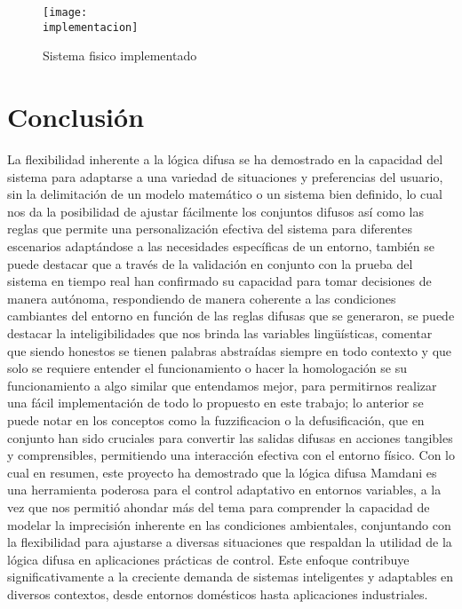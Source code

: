\documentclass[a4paper, 12pt]{article}
\newcommand{\implementacion}{img/sistemaFisico.jpg}
\begin{document}
	\begin{figure}[!h]
		\centering
		\texttt{[image: \\implementacion]}
		\caption{Sistema fisico implementado}
        \label{fig:fisico}
	\end{figure}

    \section{Conclusión}
    La flexibilidad inherente a la lógica difusa se ha demostrado en la capacidad del sistema para adaptarse a una variedad de situaciones y preferencias del usuario, sin la delimitación de un modelo matemático o un sistema bien definido, lo cual nos da  la posibilidad de ajustar fácilmente los conjuntos difusos así como las reglas que permite una personalización efectiva del sistema para diferentes escenarios adaptándose a las necesidades específicas de un entorno, también se puede destacar que a través de la validación en conjunto con la prueba del sistema en tiempo real han confirmado su capacidad para tomar decisiones de manera autónoma, respondiendo de manera coherente a las condiciones cambiantes del entorno en función de las reglas difusas que se generaron, se puede destacar la inteligibilidades que nos brinda las variables lingüísticas, comentar que siendo honestos se tienen palabras abstraídas siempre en todo contexto y que solo se requiere entender el funcionamiento o hacer la homologación se su funcionamiento a algo similar que entendamos mejor, para permitirnos realizar una fácil implementación de todo lo propuesto en este trabajo; lo anterior se puede notar en los conceptos como la fuzzificacion o la defusificación, que en conjunto han sido cruciales para convertir las salidas difusas en acciones tangibles y comprensibles, permitiendo una interacción efectiva con el entorno físico. Con lo cual en resumen, este proyecto ha demostrado que la lógica difusa Mamdani es una herramienta poderosa para el control adaptativo en entornos variables, a la vez que nos permitió ahondar más del tema para comprender la capacidad de modelar la imprecisión inherente en las condiciones ambientales, conjuntando con la flexibilidad para ajustarse a diversas situaciones que respaldan la utilidad de la lógica difusa en aplicaciones prácticas de control. Este enfoque contribuye significativamente a la creciente demanda de sistemas inteligentes y adaptables en diversos contextos, desde entornos domésticos hasta aplicaciones industriales.
\end{document}
